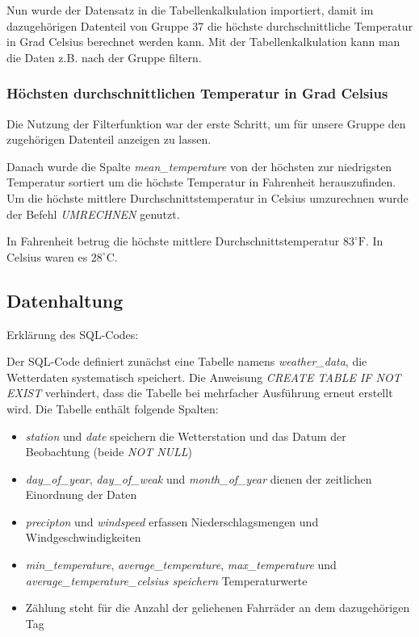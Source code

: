 \documentclass{article}
\begin{document}
Nun wurde der Datensatz in die Tabellenkalkulation importiert, damit im dazugehörigen Datenteil von Gruppe 37 die höchste durchschnittliche Temperatur in Grad Celsius berechnet werden kann. Mit der Tabellenkalkulation kann man die Daten z.B. nach der Gruppe filtern.

\subsubsection{Höchsten durchschnittlichen Temperatur in Grad Celsius}
Die Nutzung der Filterfunktion war der erste Schritt, um für unsere Gruppe den zugehörigen Datenteil anzeigen zu lassen.

Danach wurde die Spalte \textit{mean\_temperature} von der höchsten zur niedrigsten Temperatur sortiert um die höchste Temperatur in Fahrenheit herauszufinden. Um die höchste mittlere Durchschnittstemperatur in Celsius umzurechnen wurde der Befehl \textit{UMRECHNEN} genutzt.

In Fahrenheit betrug die höchste mittlere Durchschnittstemperatur $83^\circ\text{F}$. In Celsius waren es $28^\circ\text{C}$.


\newpage

\subsection{Datenhaltung}
Erklärung des SQL-Codes:

Der SQL-Code definiert zunächst eine Tabelle namens \textit{weather\_data}, die Wetterdaten systematisch speichert. Die Anweisung \textit{CREATE TABLE IF NOT EXIST} verhindert, dass die Tabelle bei mehrfacher Ausführung erneut erstellt wird. Die Tabelle enthält folgende Spalten:


\begin{itemize}
    \item \textit{station} und \textit{date} speichern die Wetterstation und das Datum der Beobachtung (beide \textit{NOT NULL}) 
    \item \textit{day\_of\_year}, \textit{day\_of\_weak} und \textit{month\_of\_year} dienen der zeitlichen Einordnung der Daten 
    \item \textit{precipton} und \textit{windspeed} erfassen Niederschlagsmengen und Windgeschwindigkeiten
    \item \textit{min\_temperature}, \textit{average\_temperature}, \textit{max\_temperature} und \textit{average\_temperature\_celsius speichern} Temperaturwerte
    \item Zählung steht für die Anzahl der geliehenen Fahrräder an dem dazugehörigen Tag
\end{itemize}
\end{document}
